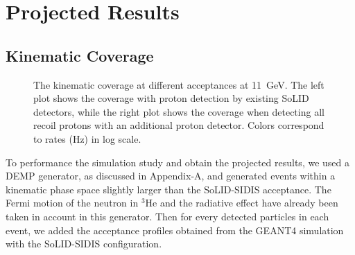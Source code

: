 \section{Projected Results}

\subsection{Kinematic Coverage}

\begin{figure}[!ht]
 \begin{center}
 \caption[The kinematic coverage at different acceptances.]{\footnotesize{The
     kinematic coverage at different acceptances at 11~GeV. The left plot
     shows the coverage with proton detection by existing SoLID
     detectors, while the right plot shows the coverage when detecting all
recoil protons with an additional proton detector. Colors correspond to rates
(Hz) in log scale.}}
  \label{kin_cor}
  \end{center}
\end{figure}
To performance the simulation study and obtain the projected results, we used a DEMP generator, as discussed in Appendix-A, 
and generated events within a kinematic phase space slightly larger than the SoLID-SIDIS acceptance. 
The Fermi motion of the neutron in $\mathrm{^{3}He}$ and the radiative effect have already been taken in account in this generator.
Then for every detected particles in each event, we added the acceptance profiles obtained from the GEANT4 simulation with the SoLID-SIDIS configuration. 

